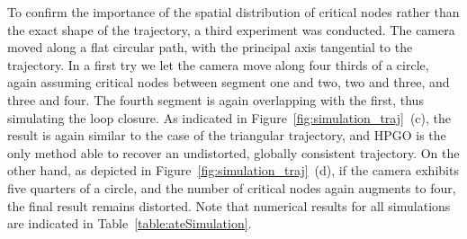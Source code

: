 \documentclass[letterpaper, 10 pt, conference]{ieeeconf}  %
\begin{document}
To confirm the importance of the spatial distribution of critical nodes rather than the exact shape of the trajectory, a third experiment was conducted. The camera moved along a flat circular path, with the principal axis tangential to the trajectory. In a first try we let the camera move along four thirds of a circle, again assuming critical nodes between segment one and two, two and three, and three and four. The fourth segment is again overlapping with the first, thus simulating the loop closure. As indicated in Figure~\ref{fig:simulation_traj}~(c), the result is again similar to the case of the triangular trajectory, and HPGO is the only method able to recover an undistorted, globally consistent trajectory. On the other hand, as depicted in Figure~\ref{fig:simulation_traj}~(d), if the camera exhibits five quarters of a circle, and the number of critical nodes again augments to four, the final result remains distorted. Note that numerical results for all simulations are indicated in Table~\ref{table:ateSimulation}.
\end{document}
